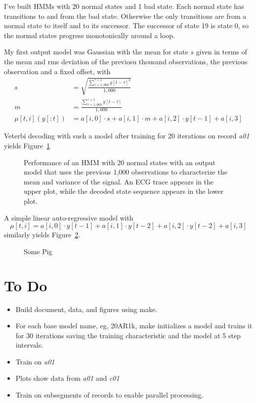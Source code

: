 \documentclass[12pt]{article}
\begin{document}
I've built HMMs with 20 normal states and 1 bad state.  Each normal
state has transitions to and from the bad state.  Otherwise the only
transitions are from a normal state to itself and to its successor.
The successor of state 19 is state 0, so the normal states progress
monotonically around a loop.

My first output model was Gaussian with the mean for state $s$ given
in terms of the mean and rms deviation of the previosu thousand
observations, the previous observation and a fixed offset, with
\begin{align*}
  s &= \sqrt{\frac{\sum_{\tau=1,000}^{\tau=1} y[t-\tau]^2}{1,000}} \\
  m &=  \frac{\sum_{\tau=1,000}^{\tau=1} y[t-\tau]}{1,000} \\
  \mu[t,i](y[:t]) &= a[i,0] \cdot s + a[i,1] \cdot m + a[i,2] \cdot
  y[t-1] + a[i,3]
\end{align*}

Veterbi decoding with such a model after training for 20 iterations on
record \emph{a01} yields Figure~\ref{fig:modelAR1k20}

\begin{figure}
  \centering
  \caption{Performance of an HMM with 20 normal states with an output
    model that uses the previous 1,000 observations to characterize
    the mean and variance of the signal.  An ECG trace appears in the
    upper plot, while the decoded state sequence appears in the lower
    plot.}
  \label{fig:modelAR1k20}
\end{figure}

A simple linear auto-regressive model with
\begin{equation*}
  \mu[t,i] = a[i,0] \cdot y[t-1] + a[i,1] \cdot y[t-2] + a[i,2] \cdot
  y[t-2]  + a[i,3]
\end{equation*}
similarly yields Figure~\ref{fig:model20AR3}.

\begin{figure}
  \centering
    \caption{Some Pig}
  \label{fig:model20AR3}
\end{figure}

\section{To Do}
\label{sec:todo}

\begin{itemize}
\item Build document, data, and figures using make.
\item For each base model name, eg, 20AR1k, make initializes a model
  and trains it for 30 iterations saving the training characteristic
  and the model at 5 step intervals.
\item Train on \emph{a01}
\item Plots show data from \emph{a01} and \emph{c01}
\item Train on subsegments of records to enable parallel processing.
\end{itemize}
\end{document}
